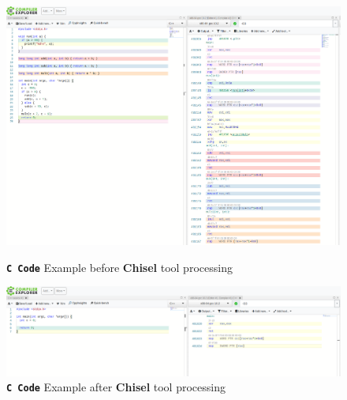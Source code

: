 \documentclass{relatorio}
\begin{document}
\begin{figure}
	\centering
	\captionsetup{justification=centering}
	\includegraphics[width=1\linewidth]{imgs/chisel_before.png}
	\caption{\textbf{\texttt{C Code}} Example \color{red} before \color{black} \textbf{Chisel} tool processing}%
	\label{fig:plant}
	\centering
	\captionsetup{justification=centering}
	\includegraphics[width=1\linewidth]{imgs/chisel_after.png}
	\caption{\textbf{\texttt{C Code}} Example \color{green} after \color{black} \textbf{Chisel} tool processing}%
	\label{fig:plant}
\end{figure}
\end{document}
